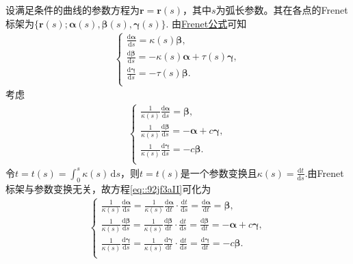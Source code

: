 \documentclass[../../main.tex]{subfiles}%
\begin{document}
\begin{solution}

设满足条件的曲线的参数方程为$\bm{r}=\bm{r}(s)$，其中$s$为弧长参数。其在各点的Frenet标架为$\{\bm{r}(s);\bm{\alpha}(s),\bm{\beta}(s),\bm{\gamma}(s)\}$.
由\hyperref[theorem:微分几何-Frenet公式]{Frenet公式}可知
\begin{align}\label{eq::Frenet1}
\begin{cases}
\frac{\mathrm{d}\boldsymbol{\alpha }}{\mathrm{d}s}=\kappa (s)\boldsymbol{\beta },\\
\frac{\mathrm{d}\boldsymbol{\beta }}{\mathrm{d}s}=-\kappa (s)\boldsymbol{\alpha }+\tau (s)\boldsymbol{\gamma },\\
\frac{\mathrm{d}\boldsymbol{\gamma }}{\mathrm{d}s}=-\tau (s)\boldsymbol{\beta }.\\
\end{cases}
\end{align}
考虑
\begin{align}\label{eq::92jf3aII}
\begin{cases}
\frac{1}{\kappa (s)}\frac{\mathrm{d}\boldsymbol{\alpha }}{\mathrm{d}s}=\boldsymbol{\beta },\\
\frac{1}{\kappa (s)}\frac{\mathrm{d}\boldsymbol{\beta }}{\mathrm{d}s}=-\boldsymbol{\alpha }+c\boldsymbol{\gamma },\\
\frac{1}{\kappa (s)}\frac{\mathrm{d}\boldsymbol{\gamma }}{\mathrm{d}s}=-c\boldsymbol{\beta }.\\
\end{cases}
\end{align}
令$t=t(s)=\int_0^s{\kappa (s)\,\mathrm{d}s}$，则$t=t(s)$是一个参数变换且$\kappa(s)=\frac{\mathrm{d}t}{\mathrm{d}s}$.由Frenet标架与参数变换无关，故方程\eqref{eq::92jf3aII}可化为
\begin{align}\label{eq::Frenet121234231}
\begin{cases}
\frac{1}{\kappa \left( s \right)}\frac{\mathrm{d}\boldsymbol{\alpha }}{\mathrm{d}s}=\frac{1}{\kappa \left( s \right)}\frac{\mathrm{d}\boldsymbol{\alpha }}{\mathrm{d}t}\cdot \frac{\mathrm{d}t}{\mathrm{d}s}=\frac{\mathrm{d}\boldsymbol{\alpha }}{\mathrm{d}t}=\boldsymbol{\beta },\\
\frac{1}{\kappa \left( s \right)}\frac{\mathrm{d}\boldsymbol{\beta }}{\mathrm{d}s}=\frac{1}{\kappa \left( s \right)}\frac{\mathrm{d}\boldsymbol{\beta }}{\mathrm{d}t}\cdot \frac{\mathrm{d}t}{\mathrm{d}s}=\frac{\mathrm{d}\boldsymbol{\beta }}{\mathrm{d}t}=-\boldsymbol{\alpha }+c\boldsymbol{\gamma },\\
\frac{1}{\kappa \left( s \right)}\frac{\mathrm{d}\boldsymbol{\gamma }}{\mathrm{d}s}=\frac{1}{\kappa \left( s \right)}\frac{\mathrm{d}\boldsymbol{\gamma }}{\mathrm{d}t}\cdot \frac{\mathrm{d}t}{\mathrm{d}s}=\frac{\mathrm{d}\boldsymbol{\gamma }}{\mathrm{d}t}=-c\boldsymbol{\beta }.\\

\end{cases}
\end{align}
\end{solution}
\end{document}

